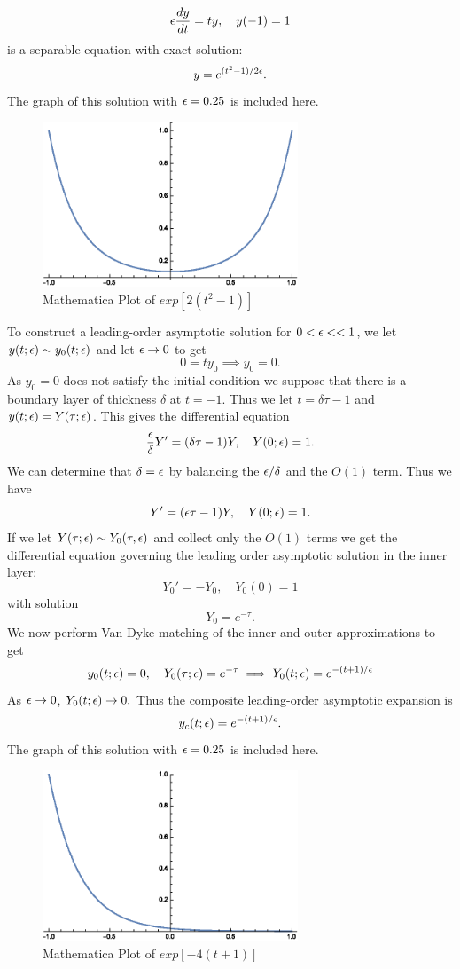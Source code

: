 \benum
\item $$\epsilon \frac{dy}{dt} = ty, \quad y(-1) = 1$$
 is a separable equation with exact solution:
 $$y=e^{(t^2-1)/2\epsilon}.$$
 The graph of this solution with $\epsilon=0.25$ is included here.
\begin{figure}[h]
  \centering
  \includegraphics[width=3in]{ass3no1prta}
  \caption{Mathematica Plot of $exp[2(t^2-1)]$}
\end{figure}
To construct a leading-order asymptotic solution for $0<\epsilon<<1$, we let $y(t;\epsilon)\sim y_0(t;\epsilon)$ and let $\epsilon\to 0$ to get
$$0=ty_0\implies y_0=0.$$
As $y_0=0$ does not satisfy the initial condition we suppose that there is a boundary layer of thickness $\delta$ at $t=-1$. Thus we let $t=\delta \tau -1$ and $y(t;\epsilon)=Y(\tau;\epsilon)$. This gives the differential equation
$$\frac{\epsilon}{\delta}Y'=(\delta\tau-1)Y,\quad Y(0;\epsilon)=1.$$
We can determine that $\delta=\epsilon$ by balancing the $\epsilon/\delta$ and the $O(1)$ term. Thus we have
$$Y'=(\epsilon\tau-1)Y,\quad Y(0;\epsilon)=1.$$
If we let $Y(\tau;\epsilon)\sim Y_0(\tau,\epsilon)$ and collect only the $O(1)$ terms we get the differential equation governing the leading order asymptotic solution in the inner layer:
$$Y_0'=-Y_0,\quad Y_0(0)=1$$
with solution
$$Y_0=e^{-\tau}.$$
We now perform Van Dyke matching of the inner and outer approximations to get
$$y_0(t;\epsilon)=0,\quad Y_0(\tau;\epsilon)=e^{-\tau}\implies Y_0(t;\epsilon)=e^{-(t+1)/\epsilon}$$
As $\epsilon\to0$, $Y_0(t;\epsilon)\to 0.$ Thus the composite leading-order asymptotic expansion is
$$y_c(t;\epsilon)=e^{-(t+1)/\epsilon}.$$
The graph of this solution with $\epsilon=0.25$ is included here.
\begin{figure}[h]
\centering\includegraphics[width=3in]{ass3no1prta2}
\caption{Mathematica Plot of $exp[-4(t+1)]$}
\end{figure}

